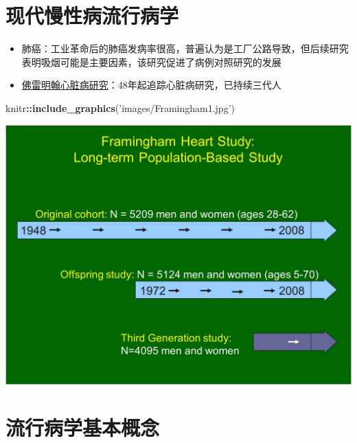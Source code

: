 \documentclass[]{book}
\newenvironment{Shaded}{\begin{snugshade}}{\end{snugshade}}
\newcommand{\KeywordTok}[1]{\textcolor[rgb]{0.13,0.29,0.53}{\textbf{#1}}}
\newcommand{\NormalTok}[1]{#1}
\newcommand{\OperatorTok}[1]{\textcolor[rgb]{0.81,0.36,0.00}{\textbf{#1}}}
\newcommand{\StringTok}[1]{\textcolor[rgb]{0.31,0.60,0.02}{#1}}
\providecommand{\tightlist}{%
  \setlength{\itemsep}{0pt}\setlength{\parskip}{0pt}}
\begin{document}
\hypertarget{ux73b0ux4ee3ux6162ux6027ux75c5ux6d41ux884cux75c5ux5b66}{%
\section{现代慢性病流行病学}\label{ux73b0ux4ee3ux6162ux6027ux75c5ux6d41ux884cux75c5ux5b66}}

\begin{itemize}
\tightlist
\item
  肺癌：工业革命后的肺癌发病率很高，普遍认为是工厂公路导致，但后续研究表明吸烟可能是主要因素，该研究促进了病例对照研究的发展
\item
  \href{http://www.framinghamheartstudy.org/}{佛雷明翰心脏病研究}：48年起追踪心脏病研究，已持续三代人
\end{itemize}

\begin{Shaded}
\begin{Highlighting}[]
\NormalTok{knitr}\OperatorTok{::}\KeywordTok{include_graphics}\NormalTok{(}\StringTok{'images/Framingham1.jpg'}\NormalTok{)}
\end{Highlighting}
\end{Shaded}

\includegraphics[width=20.86in]{images/Framingham1}

\hypertarget{ux6d41ux884cux75c5ux5b66ux57faux672cux6982ux5ff5}{%
\section{流行病学基本概念}\label{ux6d41ux884cux75c5ux5b66ux57faux672cux6982ux5ff5}}
\end{document}
